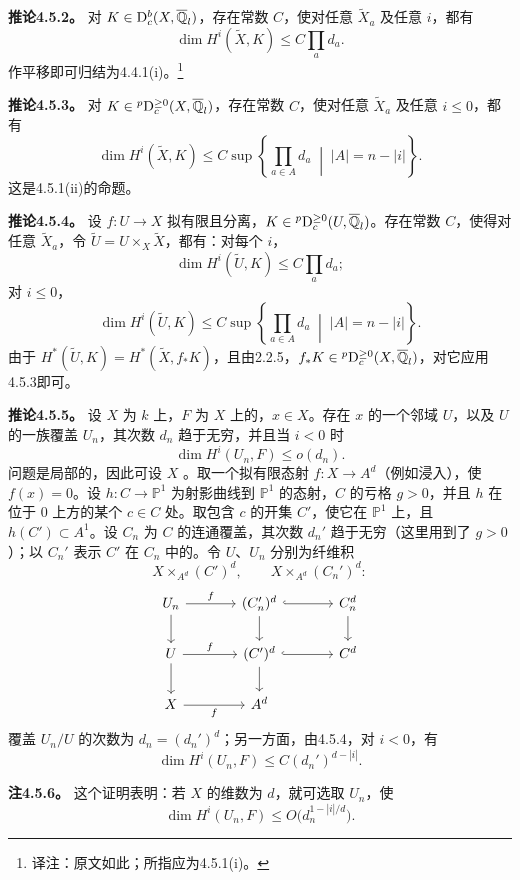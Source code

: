 \par\medskip\noindent\textbf{推论4.5.2。} 对 $K\in\mathrm{D}_c^b(X,\overline{\mathbb Q}_l)$，存在常数 $C$，使对任意 $\widetilde X_a$ 及任意 $i$，都有
\[\dim H^i(\widetilde X,K)\le C\prod_a d_a.\]
作平移即可归结为4.4.1(i)。\footnote{译注：原文如此；所指应为4.5.1(i)。}

\par\medskip\noindent\textbf{推论4.5.3。} 对 $K\in{}^p\mathrm{D}_c^{\ge0}(X,\overline{\mathbb Q}_l)$，存在常数 $C$，使对任意 $\widetilde X_a$ 及任意 $i\le0$，都有
\[\dim H^i(\widetilde X,K)\le C\sup\left\{\prod_{a\in A}d_a\;\middle|\;|A|=n-|i|\right\}.\]
这是4.5.1(ii)的命题。

\par\medskip\noindent\textbf{推论4.5.4。} 设 $f:U\to X$ 拟有限且分离，$K\in{}^p\mathrm{D}_c^{\ge0}(U,\overline{\mathbb Q}_l)$。存在常数 $C$，使得对任意 $\widetilde X_a$，令 $\widetilde U=U\times_X\widetilde X$，都有：对每个 $i$，
\[\dim H^i(\widetilde U,K)\le C\prod_a d_a;\]
对 $i\le0$，
\[\dim H^i(\widetilde U,K)\le C\sup\left\{\prod_{a\in A}d_a\;\middle|\;|A|=n-|i|\right\}.\]
由于 $H^*(\widetilde U,K)=H^*(\widetilde X,f_*K)$，且由2.2.5，$f_*K\in{}^p\mathrm{D}_c^{\ge0}(X,\overline{\mathbb Q}_l)$，对它应用4.5.3即可。

\par\medskip\noindent\textbf{推论4.5.5。} 设 $X$ 为 $k$ 上，$F$ 为 $X$ 上的，$x\in X$。存在 $x$ 的一个邻域 $U$，以及 $U$ 的一族覆盖 $U_n$，其次数 $d_n$ 趋于无穷，并且当 $i<0$ 时
\[\dim H^i(U_n,F)\le o(d_n).\]
问题是局部的，因此可设 $X$ 。取一个拟有限态射
$f:X\to A^d$（例如浸入），使 $f(x)=0$。设 $h:C\to\mathbb P^1$ 为射影曲线到 $\mathbb P^1$ 的态射，$C$ 的亏格 $g>0$，并且 $h$ 在位于 $0$ 上方的某个 $c\in C$ 处。取包含 $c$ 的开集 $C'$，使它在 $\mathbb P^1$ 上，且 $h(C')\subset A^1$。设 $C_n$ 为 $C$ 的连通覆盖，其次数 $d_n'$ 趋于无穷（这里用到了 $g>0$）；以 $C_n'$ 表示 $C'$ 在 $C_n$ 中的。令 $U$、$U_n$ 分别为纤维积
\[X\times_{A^d}(C')^d,\qquad X\times_{A^d}(C_n')^d:\]
\[
\begin{tikzcd}[ampersand replacement=\&,column sep=large]
U_n\arrow[r,"{f}"]\arrow[d]\&(C_n')^d\arrow[r,hook]\arrow[d]\&C_n^d\arrow[d]\\
U\arrow[r,"{f}"]\arrow[d]\&(C')^d\arrow[r,hook]\arrow[d]\&C^d\\
X\arrow[r,"{f}"']\&A^d\&
\end{tikzcd}
\]
覆盖 $U_n/U$ 的次数为 $d_n=(d_n')^d$；另一方面，由4.5.4，对 $i<0$，有
\[\dim H^i(U_n,F)\le C(d_n')^{d-|i|}.\]

\par\medskip\noindent\textbf{注4.5.6。} 这个证明表明：若 $X$ 的维数为 $d$，就可选取 $U_n$，使
\[\dim H^i(U_n,F)\le O\bigl(d_n^{1-|i|/d}\bigr).\]
